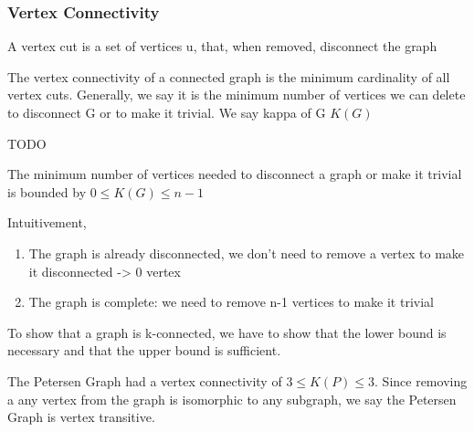 \documentclass{article}
\begin{document}
\subsubsection{Vertex Connectivity}

\begin{definition}
    A vertex cut is a set of vertices u, that, when removed, disconnect the
    graph
\end{definition}

\begin{definition}
    The vertex connectivity of a connected graph is the minimum cardinality of
    all vertex cuts. Generally, we say it is the minimum number of vertices we
    can delete to disconnect G or to make it trivial. We say kappa of G $K(G)$
\end{definition}

\begin{definition}
    TODO
\end{definition}

\begin{theorem}
    The minimum number of vertices needed to disconnect a graph or make it
    trivial is bounded by $ 0 \leq K(G) \leq n-1$
\end{theorem}

\begin{intuition}
    Intuitivement,
    \begin{enumerate}
        \item The graph is already disconnected, we don't need to remove a
	    vertex to make it disconnected -> 0 vertex
	\item The graph is complete: we need to remove n-1 vertices to make
	    it trivial
    \end{enumerate}
\end{intuition}

\begin{remark}
    To show that a graph is k-connected, we have to show that the lower bound
    is necessary and that the upper bound is sufficient.
\end{remark}

\begin{proposition}
    The Petersen Graph had a vertex connectivity of $3 \leq K(P) \leq 3$.
    Since removing a any vertex from the graph is isomorphic to any subgraph,
    we say the Petersen Graph is vertex transitive.
\end{proposition}
\end{document}
